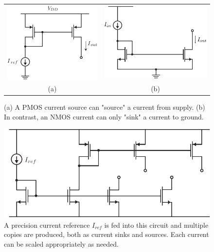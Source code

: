 \begin{figure}[t]
\centering
\begin{tabular}{cc}
\includegraphics[scale=1.05]{18mirror_pmos.pdf} &
\includegraphics[scale=1.05]{nmos_source_mirror}\\ 
(a) & (b)\\
\end{tabular}
\caption{(a) A PMOS current source can "source" a current from supply.  (b) In contrast, an NMOS current can only "sink" a current to ground.}
\label{fig:mirror_pmos}
\end{figure}
\begin{figure}[H]
\centering
\includegraphics[scale=1.15]{19current_mirror_multioutput.pdf}
\caption{A precision current reference $I_{ref}$ is fed into this circuit and multiple copies are produced, both as current sinks and sources.  Each current can be scaled appropriately as needed.}
\label{fig:current_mirror_multioutput}
\end{figure}
